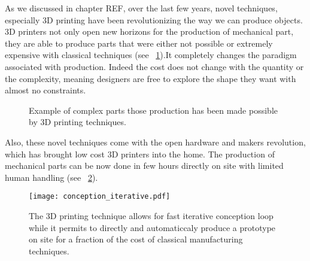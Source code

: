 As we discussed in chapter REF, over the last few years, novel techniques, especially 3D printing have been revolutionizing the way we can produce objects. 3D printers not only open new horizons for the production of mechanical part, they are able to produce parts that were either not possible or extremely expensive with classical techniques (see \figurename~\ref{fig:complex_3D_printed_part}).It completely changes the paradigm associated with production. Indeed the cost does not change with the quantity or the complexity, meaning designers are free to explore the shape they want with almost no constraints.

\begin{figure}[tb]
\centering
    \hfil
    \caption{Example of complex parts those production has been made possible by 3D printing techniques.}
    \label{fig:complex_3D_printed_part}
\end{figure}


Also, these novel techniques come with the open hardware and makers revolution, which has brought low cost 3D printers into the home. The production of mechanical parts can be now done in few hours directly on site with limited human handling (see \figurename~\ref{fig:conception_loop}).

\begin{figure}[tb]
    \begin{center}
        \texttt{[image: conception\_iterative.pdf]}
    \end{center}
    \caption{The 3D printing technique allows for fast iterative conception loop while it permits to directly and automaticcaly produce a prototype on site for a fraction of the cost of classical manufacturing techniques.}
    \label{fig:conception_loop}
\end{figure}

